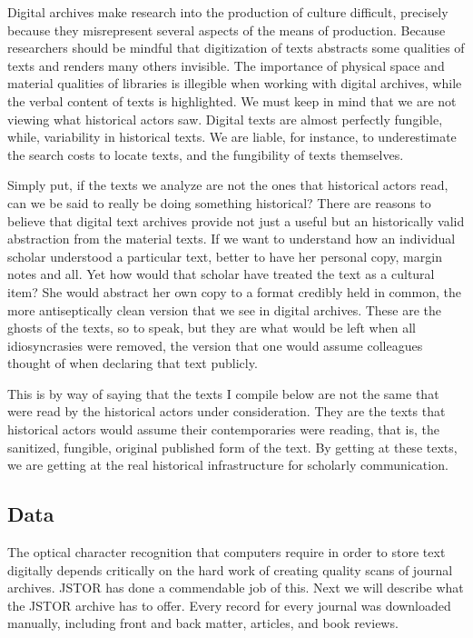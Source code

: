 \documentclass[]{book}
\theoremstyle{definition}
\theoremstyle{definition}
\theoremstyle{definition}
\theoremstyle{remark}
\begin{document}
Digital archives make research into the production of culture difficult,
precisely because they misrepresent several aspects of the means of
production. Because researchers should be mindful that digitization of
texts abstracts some qualities of texts and renders many others
invisible. The importance of physical space and material qualities of
libraries is illegible when working with digital archives, while the
verbal content of texts is highlighted. We must keep in mind that we are
not viewing what historical actors saw. Digital texts are almost
perfectly fungible, while, variability in historical texts. We are
liable, for instance, to underestimate the search costs to locate texts,
and the fungibility of texts themselves.

Simply put, if the texts we analyze are not the ones that historical
actors read, can we be said to really be doing something historical?
There are reasons to believe that digital text archives provide not just
a useful but an historically valid abstraction from the material texts.
If we want to understand how an individual scholar understood a
particular text, better to have her personal copy, margin notes and all.
Yet how would that scholar have treated the text as a cultural item? She
would abstract her own copy to a format credibly held in common, the
more antiseptically clean version that we see in digital archives. These
are the ghosts of the texts, so to speak, but they are what would be
left when all idiosyncrasies were removed, the version that one would
assume colleagues thought of when declaring that text publicly.

This is by way of saying that the texts I compile below are not the same
that were read by the historical actors under consideration. They are
the texts that historical actors would assume their contemporaries were
reading, that is, the sanitized, fungible, original published form of
the text. By getting at these texts, we are getting at the real
historical infrastructure for scholarly communication.

\hypertarget{kd-dd}{%
\subsection{Data}\label{kd-dd}}

The optical character recognition that computers require in order to
store text digitally depends critically on the hard work of creating
quality scans of journal archives. JSTOR has done a commendable job of
this. Next we will describe what the JSTOR archive has to offer. Every
record for every journal was downloaded manually, including front and
back matter, articles, and book reviews.
\end{document}
